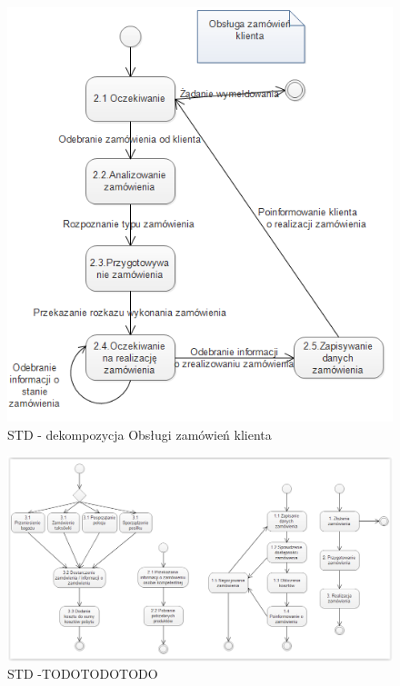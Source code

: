 \documentclass[a4paper, 11pt]{article}
\begin{document}
	\indent
	\begin{figure}[H]%
		\includegraphics[scale=1.0]{Img/STD-klient3.png}
		\caption{STD - dekompozycja Obsługi zamówień klienta}
	\end{figure}
	
	\indent
	\begin{figure}[H]%
			\includegraphics[scale=0.8]{Img/STD-2-5.png}
			\caption{STD -TODOTODOTODO}
	\end{figure}
	
\end{document}
